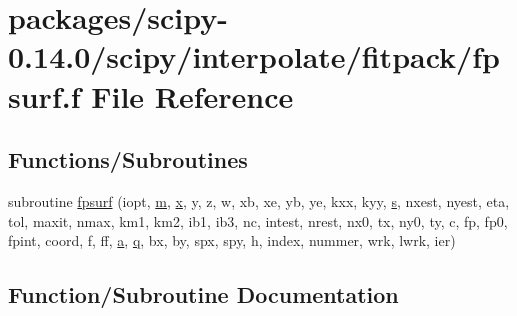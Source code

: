 \hypertarget{fpsurf_8f}{}\section{packages/scipy-\/0.14.0/scipy/interpolate/fitpack/fpsurf.f File Reference}
\label{fpsurf_8f}
\subsection*{Functions/\+Subroutines}
\begin{DoxyCompactItemize}
\item 
subroutine \hyperlink{fpsurf_8f_a92bf415936a58406bd840c2fae1553b2}{fpsurf} (iopt, \hyperlink{indexexpr_8h_ab72fdb4031d47b75ab26dd18a437bcdc}{m}, \hyperlink{vecnorm1_8cc_ac73eed9e41ec09d58f112f06c2d6cb63}{x}, y, z, w, xb, xe, yb, ye, kxx, kyy, \hyperlink{indexexpr_8h_ae024b0db549122b44c349ae28ec990dc}{s}, nxest, nyest, eta, tol, maxit, nmax, km1, km2, ib1, ib3, nc, intest, nrest, nx0, tx, ny0, ty, c, fp, fp0, fpint, coord, f, ff, \hyperlink{gen__mat5files_8m_aae328bf20413f220e38aec4d95bfd6da}{a}, \hyperlink{indexexpr_8h_ac886c3584e464b5533390d7440c9dd98}{q}, bx, by, spx, spy, h, index, nummer, wrk, lwrk, ier)
\end{DoxyCompactItemize}


\subsection{Function/\+Subroutine Documentation}
\hypertarget{fpsurf_8f_a92bf415936a58406bd840c2fae1553b2}{}

